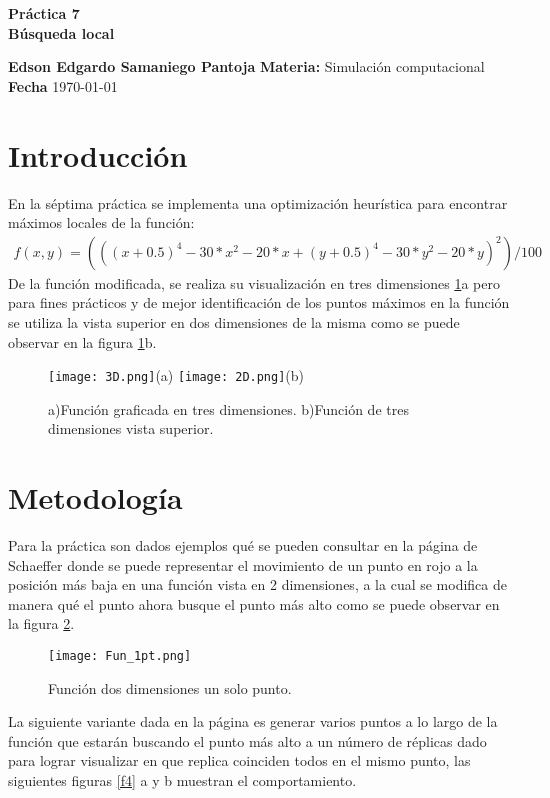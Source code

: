 \documentclass[a4paper, 11pt]{article}
\begin{document}
\begin{center}
\LARGE \bf Pr\'actica 7\\ Búsqueda local 
\end{center}

\vspace{1cm} 
\noindent\textbf {Edson Edgardo Samaniego Pantoja} \hfill \textbf{Materia:} Simulación computacional 
\hfill \\
\textbf{Fecha} \today  
\vspace{1cm} 

\section{Introducción}
En la séptima práctica se implementa una optimización heurística para encontrar máximos locales de la función:
\begin{align*}
f(x,y) = (((x + 0.5)^4 - 30 * x^2 - 20 * x + (y + 0.5)^4 - 30 * y^2 - 20 * y)^2)/100
\end{align*}
De la función modificada, se realiza su visualización en tres dimensiones \ref{f1}a pero para fines prácticos y de mejor identificación de los puntos máximos en la función se utiliza la vista superior en dos dimensiones de la misma como se puede observar en la figura \ref{f1}b.

\begin{figure}[H]
    \centering 
    \texttt{[image: 3D.png]}(a)
    \texttt{[image: 2D.png]}(b)
    \caption{a)Función graficada en tres dimensiones. b)Función de tres dimensiones vista superior.}
    \label{f1}
\end{figure}

\section{Metodología}
Para la práctica son dados ejemplos qué se pueden consultar en la página de Schaeffer \cite{elisa} donde se puede representar el movimiento de un punto en rojo a la posición más baja en una función vista en 2 dimensiones, a la cual se modifica de manera qué el punto ahora busque el punto más alto como se puede observar en la figura \ref{f3}.

\begin{figure}[H]
    \centering 
    \texttt{[image: Fun\_1pt.png]}
    \caption{Función dos dimensiones un solo punto.}
    \label{f3}
\end{figure}

La siguiente variante dada en la página \cite{elisa} es generar varios puntos a lo largo de la función que estarán buscando el punto más alto a un número de réplicas dado para lograr visualizar en que replica coinciden todos en el mismo punto, las siguientes figuras \ref{f4} a y b muestran el comportamiento.
\end{document}
